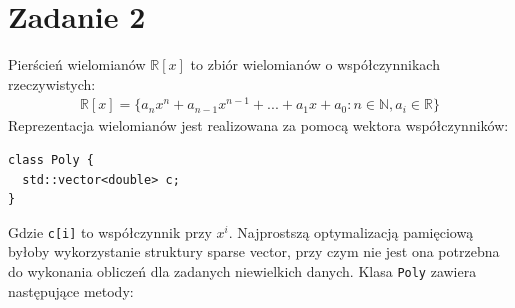 \documentclass[12pt, a4paper]{article}
\begin{document}
\section{Zadanie 2}

Pierścień wielomianów $\mathbb{R}[x]$ to zbiór wielomianów o współczynnikach rzeczywistych:
\begin{align*}
    \mathbb{R}[x] = \{ a_n x^n + a_{n-1} x^{n-1} + ... + a_1 x + a_0 : n \in \mathbb{N}, a_i \in \mathbb{R} \}
\end{align*}
Reprezentacja wielomianów jest realizowana za pomocą wektora współczynników:
\begin{verbatim}
class Poly {
  std::vector<double> c;
}
\end{verbatim}
Gdzie \texttt{c[i]} to współczynnik przy $x^i$. Najprostszą optymalizacją pamięciową byłoby wykorzystanie struktury sparse vector,
przy czym nie jest ona potrzebna do wykonania obliczeń dla zadanych niewielkich danych.
Klasa \texttt{Poly} zawiera następujące metody:
\end{document}
